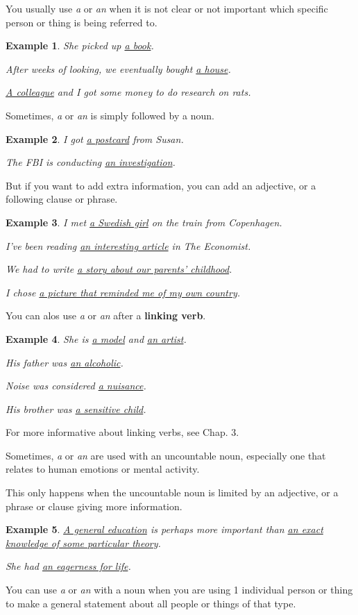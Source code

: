 \documentclass[oneside]{book}
\numberwithin{equation}{section}
\newtheorem{example}{Example}[section]
\begin{document}
%
You usually use \textit{a} or \textit{an} when it is not clear or not important which specific person or thing is being referred to.
\begin{example}
    She picked up \underline{a book}.
    
    After weeks of looking, we eventually bought \underline{a house}.
    
    \underline{A colleague} and I got some money to do research on rats. 
\end{example}
%
\noindent{} Sometimes, \textit{a} or \textit{an} is simply followed by a noun.
\begin{example}
    I got \underline{a postcard} from Susan.
    
    The FBI is conducting \underline{an investigation}.
\end{example}
But if you want to add extra information, you can add an adjective, or a following clause or phrase.
\begin{example}
    I met \underline{a Swedish girl} on the train from Copenhagen.
    
    I've been reading \underline{an interesting article} in The Economist.
    
    We had to write \underline{a story about our parents' childhood}.
    
    I chose \underline{a picture that reminded me of my own country}.
\end{example}
%
\noindent{} You can alos use \textit{a} or \textit{an} after a \textbf{linking verb}.
\begin{example}
    She is \underline{a model} and \underline{an artist}.
    
    His father was \underline{an alcoholic}.
    
    Noise was considered \underline{a nuisance}.
    
    His brother was \underline{a sensitive child}.
\end{example}
For more informative about linking verbs, see Chap. 3.

%
\noindent{} Sometimes, \textit{a} or \textit{an} are used with an uncountable noun, especially one that relates to human emotions or mental activity.

This only happens when the uncountable noun is limited by an adjective, or a phrase or clause giving more information.
\begin{example}
    \underline{A general education} is perhaps more important than \underline{an exact knowledge of some particular theory}.
    
    She had \underline{an eagerness for life}.
\end{example}
%
\noindent{} You can use \textit{a} or \textit{an} with a noun when you are using 1 individual person or thing to make a general statement about all people or things of that type.
\end{document}
